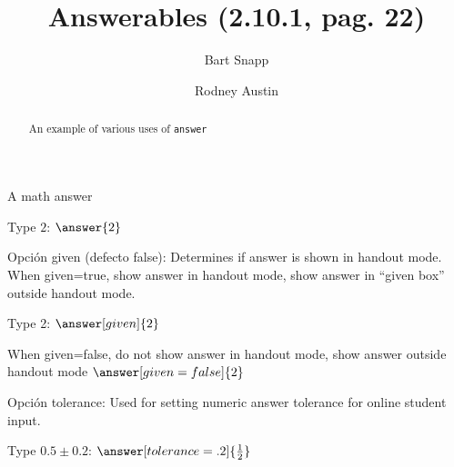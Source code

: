 \documentclass{ximera}
\title[Examples:]{Answerables (2.10.1, pag. 22)}
\author{Bart Snapp \and Rodney Austin}
\begin{document}
\begin{abstract}
  An example of various uses of \texttt{answer}
\end{abstract}
\maketitle

A math answer

Type $2$: $\answer{2}$

Opción  {\ttfamily given} (defecto false): Determines if answer is shown in handout mode. 
When given=true, show answer in handout mode, show answer in “given box” outside handout mode. 

Type 2: $\answer[given]{2}$

When given=false, do not show answer in handout mode, show answer outside handout mode  
$\answer[given=false]{2}$

Opción {\ttfamily tolerance}: Used for setting numeric answer tolerance for online student input.

Type $0.5\pm 0.2$: $\answer[tolerance=.2]{\frac{1}{2}}$
\end{document}
